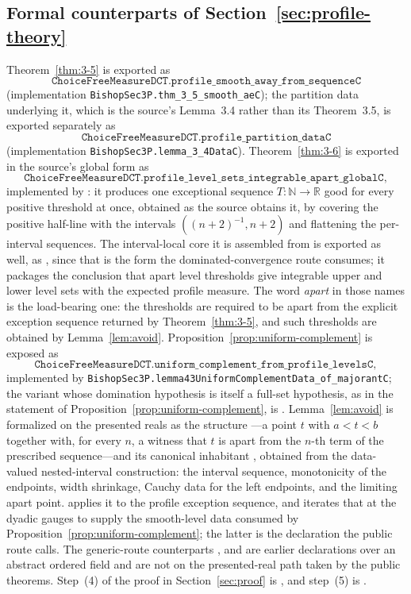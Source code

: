 \documentclass[11pt]{article}
\theoremstyle{definition}
\theoremstyle{remark}
\begin{document}
\subsection{Formal counterparts of Section~\ref{sec:profile-theory}}
Theorem~\ref{thm:3-5} is exported as
\[
\texttt{ChoiceFreeMeasureDCT.profile\_smooth\_away\_from\_sequenceC}
\]
(implementation \texttt{BishopSec3P.thm\_3\_5\_smooth\_aeC}); the partition data underlying it, which is the
source's Lemma~3.4 rather than its Theorem~3.5, is exported separately as
\[
\texttt{ChoiceFreeMeasureDCT.profile\_partition\_dataC}
\]
(implementation \texttt{BishopSec3P.lemma\_3\_4DataC}).  Theorem~\ref{thm:3-6} is exported in the source's global form as
\[
\texttt{ChoiceFreeMeasureDCT.profile\_level\_sets\_integrable\_apart\_globalC},
\]
implemented by : it produces one exceptional sequence $T:\mathbb{N}\to\mathbb{R}$ good for every positive threshold at once, obtained as the source obtains it, by covering the positive half-line with the intervals $((n{+}2)^{-1},n{+}2)$ and flattening the per-interval sequences.  The interval-local core it is assembled from is exported as well, as , since that is the form the dominated-convergence route consumes; it packages the conclusion that apart level thresholds give integrable upper and lower level sets with the expected profile measure.  The word \emph{apart} in those names is the load-bearing one: the thresholds are required to be apart from the explicit exception sequence returned by Theorem~\ref{thm:3-5}, and such thresholds are obtained by Lemma~\ref{lem:avoid}.  Proposition~\ref{prop:uniform-complement} is exposed as
\[
\texttt{ChoiceFreeMeasureDCT.uniform\_complement\_from\_profile\_levelsC},
\]
implemented by \texttt{BishopSec3P.lemma43UniformComplementData\_of\_majorantC}; the variant whose domination hypothesis is itself a full-set hypothesis, as in the statement of Proposition~\ref{prop:uniform-complement}, is .  Lemma~\ref{lem:avoid} is formalized on the presented reals as the structure ---a point $t$ with $a<t<b$ together with, for every $n$, a witness that $t$ is apart from the $n$-th term of the prescribed sequence---and its canonical inhabitant , obtained from the data-valued nested-interval construction: the interval sequence, monotonicity of the endpoints, width shrinkage, Cauchy data for the left endpoints, and the limiting apart point.   applies it to the profile exception sequence, and  iterates that at the dyadic gauges to supply the smooth-level data consumed by Proposition~\ref{prop:uniform-complement}; the latter is the declaration the public  route calls.  The generic-route counterparts ,  and  are earlier declarations over an abstract ordered field and are not on the presented-real path taken by the public theorems.  Step~(4) of the proof in Section~\ref{sec:proof} is , and step~(5) is .
\end{document}
